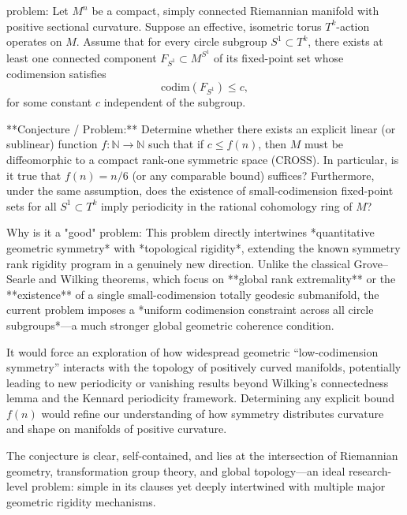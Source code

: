 problem:  
Let \( M^n \) be a compact, simply connected Riemannian manifold with positive sectional curvature. Suppose an effective, isometric torus \( T^k \)-action operates on \( M \).  
Assume that for every circle subgroup \( S^1 \subset T^k \), there exists at least one connected component \( F_{S^1} \subset M^{S^1} \) of its fixed-point set whose codimension satisfies  
\[
\mathrm{codim}(F_{S^1}) \le c,
\]  
for some constant \( c \) independent of the subgroup.  

**Conjecture / Problem:**  
Determine whether there exists an explicit linear (or sublinear) function \( f: \mathbb{N} \to \mathbb{N} \) such that if \( c \le f(n) \), then \( M \) must be diffeomorphic to a compact rank-one symmetric space (CROSS).  
In particular, is it true that \( f(n) = n/6 \) (or any comparable bound) suffices?  
Furthermore, under the same assumption, does the existence of small-codimension fixed-point sets for all \( S^1 \subset T^k \) imply periodicity in the rational cohomology ring of \( M \)?

Why is it a "good" problem:  
This problem directly intertwines *quantitative geometric symmetry* with *topological rigidity*, extending the known symmetry rank rigidity program in a genuinely new direction. Unlike the classical Grove–Searle and Wilking theorems, which focus on **global rank extremality** or the **existence** of a single small-codimension totally geodesic submanifold, the current problem imposes a *uniform codimension constraint across all circle subgroups*—a much stronger global geometric coherence condition.  

It would force an exploration of how widespread geometric “low-codimension symmetry” interacts with the topology of positively curved manifolds, potentially leading to new periodicity or vanishing results beyond Wilking’s connectedness lemma and the Kennard periodicity framework. Determining any explicit bound \( f(n) \) would refine our understanding of how symmetry distributes curvature and shape on manifolds of positive curvature.  

The conjecture is clear, self-contained, and lies at the intersection of Riemannian geometry, transformation group theory, and global topology—an ideal research-level problem: simple in its clauses yet deeply intertwined with multiple major geometric rigidity mechanisms.